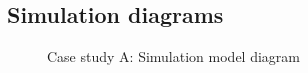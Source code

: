 \begin{appendices}
\chapter{Simulation diagrams}
\newpage
	
	\begin{figure}[h!]
		\centering
		\caption{Case study A: Simulation model diagram}
		\label{fig: BEET Baseline model}
	\end{figure}


\end{appendices}
